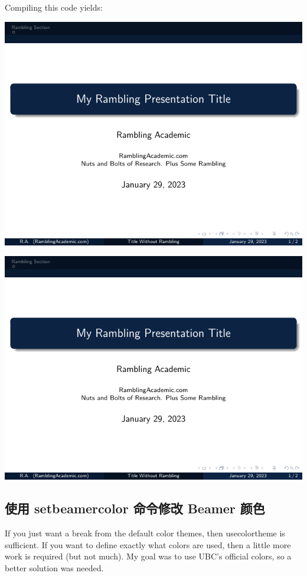 \begin{column}{0.5\textwidth}
Compiling this code yields:

\includegraphics[page=1]{examples/beamer/color-usecolortheme.pdf}

\includegraphics[page=2]{examples/beamer/color-usecolortheme.pdf}

\subsection{使用 {\ttfamily setbeamercolor} 命令修改 Beamer 颜色}

If you just want a break from the default color themes, then {\ttfamily usecolortheme} is sufficient. If you want to define exactly what colors are used, then a little more work is required (but not much). My goal was to use UBC’s official colors, so a better solution was needed.


\end{column}
